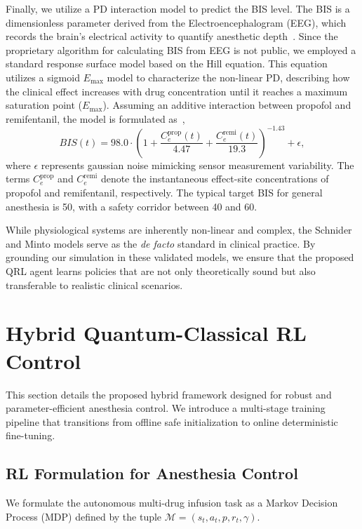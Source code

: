 \documentclass[pdflatex,sn-mathphys-num]{sn-jnl}%
\theoremstyle{thmstyleone}%
\theoremstyle{thmstyletwo}%
\theoremstyle{thmstylethree}%
\begin{document}
Finally, we utilize a PD interaction model to predict the BIS level. The BIS is a dimensionless parameter derived from the Electroencephalogram (EEG), which records the brain's electrical activity to quantify anesthetic depth~\citep{ram_98_apr}. Since the proprietary algorithm for calculating BIS from EEG is not public, we employed a standard response surface model based on the Hill equation. This equation utilizes a sigmoid $E_{\max}$ model to characterize the non-linear PD, describing how the clinical effect increases with drug concentration until it reaches a maximum saturation point ($E_{\max}$). Assuming an additive interaction between propofol and remifentanil, the model is formulated as~\citep{nie_03_res},
\begin{equation}
    \label{eq:bis}
    \textit{BIS}(t) = 98.0 \cdot \left(1 + \frac{C_{e}^{\text{prop}}(t)}{4.47}  + \frac{C_{e}^{\text{remi}}(t)}{19.3}\right)^{-1.43} + \epsilon,
\end{equation}
where $\epsilon$ represents gaussian noise mimicking sensor measurement variability. The terms $C_{e}^{\text{prop}}$ and $C_{e}^{\text{remi}}$ denote the instantaneous effect-site concentrations of propofol and remifentanil, respectively. The typical target BIS for general anesthesia is 50, with a safety corridor between 40 and 60.

While physiological systems are inherently non-linear and complex, the Schnider and Minto models serve as the \textit{de facto} standard in clinical practice. By grounding our simulation in these validated models, we ensure that the proposed QRL agent learns policies that are not only theoretically sound but also transferable to realistic clinical scenarios.

\section{Hybrid Quantum-Classical RL Control} \label{sec:compact_qrl}
This section details the proposed hybrid framework designed for robust and parameter-efficient anesthesia control. We introduce a multi-stage training pipeline that transitions from offline safe initialization to online deterministic fine-tuning.

\subsection{RL Formulation for Anesthesia Control}
We formulate the autonomous multi-drug infusion task as a Markov Decision Process (MDP) defined by the tuple $\mathcal{M} = (s_t, a_t, p, r_t, \gamma)$.
\end{document}
